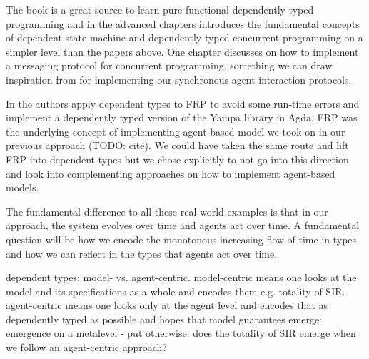 The book \cite{brady_type-driven_2017} is a great source to learn pure functional dependently typed programming and in the advanced chapters introduces the fundamental concepts of dependent state machine and dependently typed concurrent programming on a simpler level than the papers above. One chapter discusses on how to implement a messaging protocol for concurrent programming, something we can draw inspiration from for implementing our synchronous agent interaction protocols.

In \cite{sculthorpe_safe_2009} the authors apply dependent types to FRP to avoid some run-time errors and implement a dependently typed version of the Yampa library in Agda. FRP was the underlying concept of implementing agent-based model we took on in our previous approach (TODO: cite). We could have taken the same route and lift FRP into dependent types but we chose explicitly to not go into this direction and look into complementing approaches on how to implement agent-based models.

The fundamental difference to all these real-world examples is that in our approach, the system evolves over time and agents act over time. A fundamental question will be how we encode the monotonous increasing flow of time in types and how we can reflect in the types that agents act over time.



dependent types: model- vs. agent-centric. model-centric means one looks at the model and its specifications as a whole and encodes them e.g. totality of SIR. agent-centric means one looks only at the agent level and encodes that as dependently typed as possible and hopes that model guarantees emerge: emergence on a metalevel - put otherwise: does the totality of SIR emerge when we follow an agent-centric approach?

